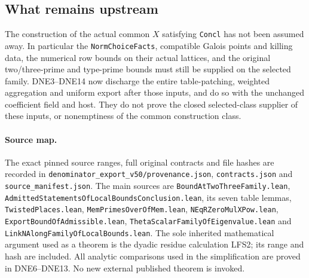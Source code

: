 \documentclass[11pt,a4paper]{article}
\numberwithin{equation}{section}
\theoremstyle{remark}\newtheorem{remark}[theorem]{Remark}
\begin{document}

\subsection{What remains upstream}

The construction of the actual common $X$ satisfying
\texttt{Concl} has not been assumed away.  In particular the
\texttt{Norm\allowbreak Choice\allowbreak Facts}, compatible Galois points and killing data,
the numerical row bounds on their actual lattices, and the original
two/three-prime and type-prime bounds must still be supplied on
the selected family.  DNE3--DNE14 now discharge the entire
table-patching, weighted aggregation and uniform export after those
inputs, and do so with the unchanged coefficient field and host.
They do not prove the closed selected-class supplier of these inputs,
or nonemptiness of the common construction class.

\paragraph{Source map.}
The exact pinned source ranges, full original contracts and file hashes
are recorded in \texttt{denominator\_\allowbreak export\_\allowbreak v50/\allowbreak provenance.\allowbreak json},
\texttt{contracts.\allowbreak json} and \texttt{source\_\allowbreak manifest.\allowbreak json}.
The main sources are \texttt{Bound\allowbreak At\allowbreak Two\allowbreak Three\allowbreak Family.\allowbreak lean},
\texttt{Admitted\allowbreak Statements\allowbreak Of\allowbreak Local\allowbreak Bounds\allowbreak Conclusion.\allowbreak lean}, its seven
table lemmas, \texttt{Twisted\allowbreak Places.\allowbreak lean},
\texttt{Mem\allowbreak Primes\allowbreak Over\allowbreak Of\allowbreak Mem.\allowbreak lean}, \texttt{NEq\allowbreak RZero\allowbreak Mul\allowbreak XPow.\allowbreak lean},
\texttt{Export\allowbreak Bound\allowbreak Of\allowbreak Admissible.\allowbreak lean},
\texttt{Theta\allowbreak Scalar\allowbreak Family\allowbreak Of\allowbreak Eigenvalue.\allowbreak lean} and
\texttt{Link\allowbreak NAlong\allowbreak Family\allowbreak Of\allowbreak Local\allowbreak Bounds.\allowbreak lean}.
The sole inherited mathematical argument used as a theorem is the
dyadic residue calculation LFS2; its range and hash are included.
All analytic comparisons used in the simplification are proved in
DNE6--DNE13.  No new external published theorem is invoked.

\endgroup
\end{document}
